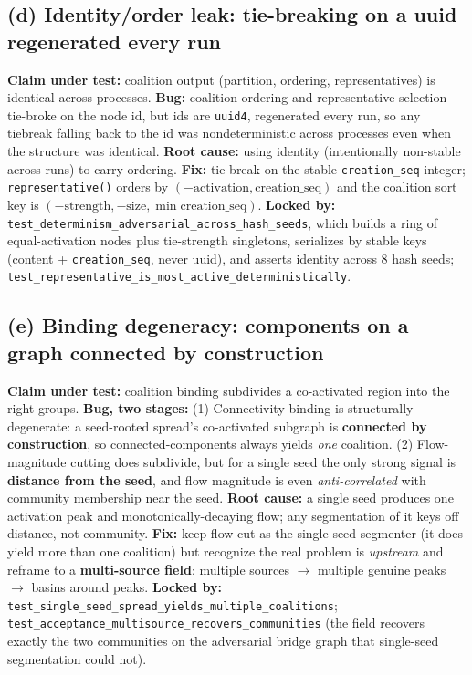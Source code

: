 \documentclass[11pt]{article}
\newcommand{\code}[1]{\texttt{#1}}
\begin{document}
\subsection{(d) Identity/order leak: tie-breaking on a uuid regenerated every run}\label{sec:findD}
\textbf{Claim under test:} coalition output (partition, ordering, representatives) is identical across
processes.
\textbf{Bug:} coalition ordering and representative selection tie-broke on the node id, but ids are
\code{uuid4}, regenerated every run, so any tiebreak falling back to the id was nondeterministic across
processes even when the structure was identical.
\textbf{Root cause:} using identity (intentionally non-stable across runs) to carry ordering.
\textbf{Fix:} tie-break on the stable \code{creation_seq} integer; \code{representative()} orders by
$(-\text{activation}, \text{creation\_seq})$ and the coalition sort key is
$(-\text{strength}, -\text{size}, \min \text{creation\_seq})$.
\textbf{Locked by:} \code{test_determinism_adversarial_across_hash_seeds}, which builds a ring of
equal-activation nodes plus tie-strength singletons, serializes by stable keys (content +
\code{creation_seq}, never uuid), and asserts identity across 8 hash seeds;
\code{test_representative_is_most_active_deterministically}.

\subsection{(e) Binding degeneracy: components on a graph connected by construction}
\textbf{Claim under test:} coalition binding subdivides a co-activated region into the right groups.
\textbf{Bug, two stages:} (1) Connectivity binding is structurally degenerate: a seed-rooted spread's
co-activated subgraph is \textbf{connected by construction}, so connected-components always yields
\emph{one} coalition. (2) Flow-magnitude cutting does subdivide, but for a single seed the only strong
signal is \textbf{distance from the seed}, and flow magnitude is even \emph{anti-correlated} with
community membership near the seed.
\textbf{Root cause:} a single seed produces one activation peak and monotonically-decaying flow; any
segmentation of it keys off distance, not community.
\textbf{Fix:} keep flow-cut as the single-seed segmenter (it does yield more than one coalition) but
recognize the real problem is \emph{upstream} and reframe to a \textbf{multi-source field}: multiple
sources $\rightarrow$ multiple genuine peaks $\rightarrow$ basins around peaks.
\textbf{Locked by:} \code{test_single_seed_spread_yields_multiple_coalitions};
\code{test_acceptance_multisource_recovers_communities} (the field recovers exactly the two communities
on the adversarial bridge graph that single-seed segmentation could not).
\end{document}
